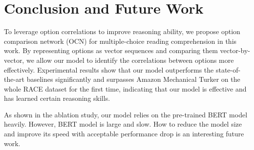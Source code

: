 \documentclass[11pt,a4paper]{article}
\begin{document}
\section{Conclusion and Future Work}
To leverage option correlations to improve reasoning ability, we propose option comparison network (OCN) for multiple-choice reading comprehension in this work. By representing options as vector sequences and comparing them vector-by-vector, we allow our model to identify the correlations between options more effectively.
Experimental results show that our model outperforms the state-of-the-art baselines significantly and surpasses Amazon Mechanical Turker on the whole RACE dataset for the first time, indicating that our model is effective and has learned certain reasoning skills.


As shown in the ablation study, our model relies on the pre-trained BERT model heavily. However, BERT model is large and slow. How to reduce the model size and improve its speed with acceptable performance drop is an interesting future work.




\appendix
\end{document}
